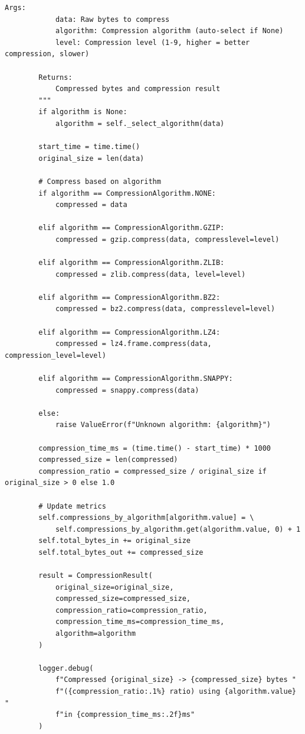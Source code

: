 \begin{lstlisting}[style=python, caption={Compression Optimizer for Data Types}]
        Args:
            data: Raw bytes to compress
            algorithm: Compression algorithm (auto-select if None)
            level: Compression level (1-9, higher = better compression, slower)

        Returns:
            Compressed bytes and compression result
        """
        if algorithm is None:
            algorithm = self._select_algorithm(data)

        start_time = time.time()
        original_size = len(data)

        # Compress based on algorithm
        if algorithm == CompressionAlgorithm.NONE:
            compressed = data

        elif algorithm == CompressionAlgorithm.GZIP:
            compressed = gzip.compress(data, compresslevel=level)

        elif algorithm == CompressionAlgorithm.ZLIB:
            compressed = zlib.compress(data, level=level)

        elif algorithm == CompressionAlgorithm.BZ2:
            compressed = bz2.compress(data, compresslevel=level)

        elif algorithm == CompressionAlgorithm.LZ4:
            compressed = lz4.frame.compress(data, compression_level=level)

        elif algorithm == CompressionAlgorithm.SNAPPY:
            compressed = snappy.compress(data)

        else:
            raise ValueError(f"Unknown algorithm: {algorithm}")

        compression_time_ms = (time.time() - start_time) * 1000
        compressed_size = len(compressed)
        compression_ratio = compressed_size / original_size if original_size > 0 else 1.0

        # Update metrics
        self.compressions_by_algorithm[algorithm.value] = \
            self.compressions_by_algorithm.get(algorithm.value, 0) + 1
        self.total_bytes_in += original_size
        self.total_bytes_out += compressed_size

        result = CompressionResult(
            original_size=original_size,
            compressed_size=compressed_size,
            compression_ratio=compression_ratio,
            compression_time_ms=compression_time_ms,
            algorithm=algorithm
        )

        logger.debug(
            f"Compressed {original_size} -> {compressed_size} bytes "
            f"({compression_ratio:.1%} ratio) using {algorithm.value} "
            f"in {compression_time_ms:.2f}ms"
        )


\end{lstlisting}
